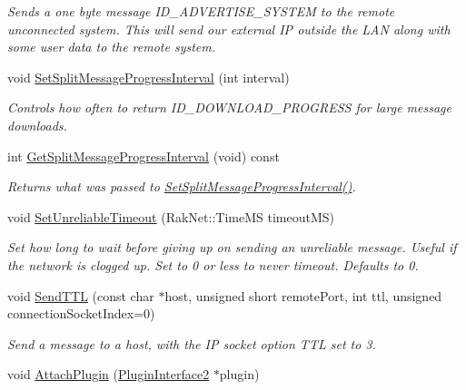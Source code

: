 \begin{DoxyCompactItemize}
\begin{DoxyCompactList}\small\item\em Sends a one byte message I\-D\-\_\-\-A\-D\-V\-E\-R\-T\-I\-S\-E\-\_\-\-S\-Y\-S\-T\-E\-M to the remote unconnected system. This will send our external I\-P outside the L\-A\-N along with some user data to the remote system. \end{DoxyCompactList}\item 
void \hyperlink{class_rak_net_1_1_rak_peer_a35e89d9813d6f6e7f2144a6a0437a33b}{Set\-Split\-Message\-Progress\-Interval} (int interval)
\begin{DoxyCompactList}\small\item\em Controls how often to return I\-D\-\_\-\-D\-O\-W\-N\-L\-O\-A\-D\-\_\-\-P\-R\-O\-G\-R\-E\-S\-S for large message downloads. \end{DoxyCompactList}\item 
int \hyperlink{class_rak_net_1_1_rak_peer_af9f01256eab673794028fe48980ef6fa}{Get\-Split\-Message\-Progress\-Interval} (void) const 
\begin{DoxyCompactList}\small\item\em Returns what was passed to \hyperlink{class_rak_net_1_1_rak_peer_a35e89d9813d6f6e7f2144a6a0437a33b}{Set\-Split\-Message\-Progress\-Interval()}. \end{DoxyCompactList}\item 
void \hyperlink{class_rak_net_1_1_rak_peer_a739faf1ea8c90aded5e11bfc105b956e}{Set\-Unreliable\-Timeout} (Rak\-Net\-::\-Time\-M\-S timeout\-M\-S)
\begin{DoxyCompactList}\small\item\em Set how long to wait before giving up on sending an unreliable message. Useful if the network is clogged up. Set to 0 or less to never timeout. Defaults to 0. \end{DoxyCompactList}\item 
void \hyperlink{class_rak_net_1_1_rak_peer_a86b8b2a8d2e4edc2c1d89f6bde8b9f28}{Send\-T\-T\-L} (const char $\ast$host, unsigned short remote\-Port, int ttl, unsigned connection\-Socket\-Index=0)
\begin{DoxyCompactList}\small\item\em Send a message to a host, with the I\-P socket option T\-T\-L set to 3. \end{DoxyCompactList}\item 
void \hyperlink{class_rak_net_1_1_rak_peer_a4ceacd63ae51089a2e36287c54f07ffe}{Attach\-Plugin} (\hyperlink{class_rak_net_1_1_plugin_interface2}{Plugin\-Interface2} $\ast$plugin)

\end{DoxyCompactItemize}
